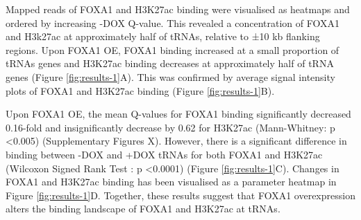 \documentclass[
  12pt,
]{article}
\begin{document}
Mapped reads of FOXA1 and H3K27ac binding were visualised as heatmaps and ordered by increasing -DOX Q-value.
This revealed a concentration of FOXA1 and H3k27ac at approximately half of tRNAs, relative to ±10 kb flanking regions.
Upon FOXA1 OE, FOXA1 binding increased at a small proportion of tRNAs genes and H3K27ac binding decreases at approximately half of tRNA genes (Figure \ref{fig:results-1}A).
This was confirmed by average signal intensity plots of FOXA1 and H3K27ac binding (Figure \ref{fig:results-1}B).

Upon FOXA1 OE, the mean Q-values for FOXA1 binding significantly decreased 0.16-fold and insignificantly decrease by 0.62 for H3K27ac (Mann-Whitney: p \textless0.005) (Supplementary Figures X).
However, there is a significant difference in binding between -DOX and +DOX tRNAs for both FOXA1 and H3K27ac (Wilcoxon Signed Rank Test : p \textless0.0001) (Figure \ref{fig:results-1}C).
Changes in FOXA1 and H3K27ac binding has been visualised as a parameter heatmap in Figure \ref{fig:results-1}D. Together, these results suggest that FOXA1 overexpression alters the binding landscape of FOXA1 and H3K27ac at tRNAs.
\end{document}
